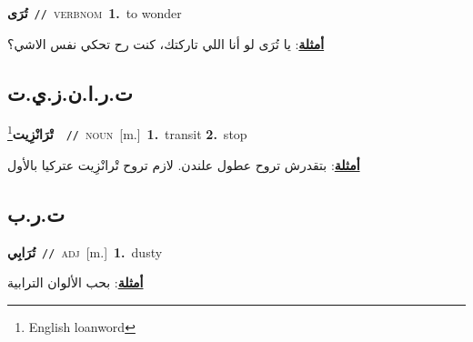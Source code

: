 \documentclass[10pt,a4paper,twoside]{article} %
\begin{document}
\begin{multicols}{2}
{\setlength\topsep{0pt}\textbf{\foreignlanguage{arabic}{تُرَى}}\ {\color{gray}\texttt{//}\color{black}}\ \textsc{verb\textunderscore nom}\ \textbf{1.}~to wonder\  \begin{flushright}\color{gray}\foreignlanguage{arabic}{\textbf{\underline{\foreignlanguage{arabic}{أمثلة}}}: يا تُرَى لو أنا اللي تاركتك، كنت رح تحكي نفس الاشي؟}\end{flushright}\color{black}} \vspace{2mm}

\vspace{-3mm}
\subsection*{\color{blue}\foreignlanguage{arabic}{ت.ر.ا.ن.ز.ي.ت}\color{blue}{ (ntws)}} 

{\setlength\topsep{0pt}\textbf{\foreignlanguage{arabic}{تْرَانْزِيت}}\footnote{English loanword}\ \ {\color{gray}\texttt{//}\color{black}}\ \textsc{noun}\ [m.]\ \textbf{1.}~transit  \textbf{2.}~stop\  \begin{flushright}\color{gray}\foreignlanguage{arabic}{\textbf{\underline{\foreignlanguage{arabic}{أمثلة}}}: بتقدرش تروح عطول علندن. لازم تروح تْرانْزِيت عتركيا بالأول}\end{flushright}\color{black}} \vspace{2mm}

\vspace{-3mm}
\subsection*{\color{blue}\foreignlanguage{arabic}{ت.ر.ب}\color{blue}{}} 

{\setlength\topsep{0pt}\textbf{\foreignlanguage{arabic}{تُرَابِي}}\ {\color{gray}\texttt{//}\color{black}}\ \textsc{adj}\ [m.]\ \textbf{1.}~dusty\  \begin{flushright}\color{gray}\foreignlanguage{arabic}{\textbf{\underline{\foreignlanguage{arabic}{أمثلة}}}: بحب الألوان الترابية}\end{flushright}\color{black}} \vspace{2mm}


\end{multicols}
\end{document}
